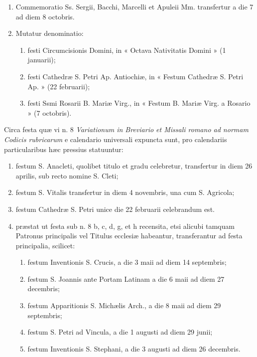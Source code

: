 \documentclass[vesperale_romanum.tex]{subfiles}
\begin{document}
\begin{enumerate}
\item Commemoratio Ss. Sergii, Bacchi, Marcelli et Apuleii Mm. transfertur a die 7 ad diem 8 octobris.

\item Mutatur denominatio:
\begin{enumerate}[nosep,label=\alph*.]
\item festi Circumcisionis Domini, in « Octava Nativitatis Domini »
(1 januarii);
\item festi Cathedræ S. Petri Ap. Antiochiæ, in « Festum Cathedræ S. Petri Ap. » (22 februarii);
\item festi Ssmi Rosarii B. Mariæ Virg., in « Festum B. Mariæ Virg.
a Rosario » (7 octobris).
\end{enumerate}\end{enumerate}

Circa festa quæ vi n. 8 \textit{Variationum in Breviario et Missali romano ad normam Codicis rubricarum} e calendario universali expuncta sunt, pro calendariis particularibus hæc pressius statuuntur:
\begin{enumerate}[nosep,label=\alph*.]
\item  festum S. Anacleti, quolibet titulo et gradu celebretur, transfertur in diem 26 aprilis, sub recto nomine S. Cleti;
\item festum S. Vitalis transfertur in diem 4 novembris, una cum S. Agricola;
\item festum Cathedræ S. Petri unice die 22 februarii celebrandum est.
\item præstat ut festa sub n. 8 b, c, d, g, et h recensita, etsi alicubi tamquam Patronus principalis vel Titulus ecclesiæ habeantur, transferantur ad festa principalia, scilicet:
\begin{enumerate}[nosep,label=\arabic*.]
\item festum Inventionis S. Crucis, a die 3 maii ad diem 14 septembris;
\item festum S. Joannis ante Portam Latinam a die 6 maii ad diem 27 decembris;
\item festum Apparitionis S. Michælis Arch., a die 8 maii ad diem 29 septembris;
\item festum S. Petri ad Vincula, a die 1 augusti ad diem 29 junii;
\item festum Inventionis S. Stephani, a die 3 augusti ad diem 26 decembris.
\end{enumerate}
\end{enumerate}
\end{document}
